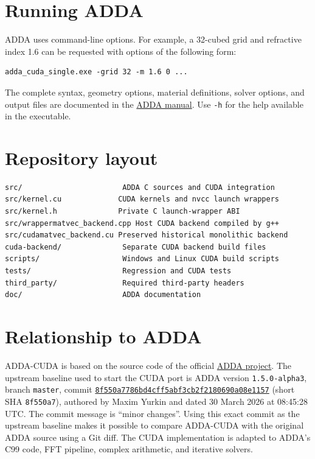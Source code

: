 \documentclass[11pt,a4paper]{article}
\newcommand{\code}[1]{\nolinkurl{#1}}
\begin{document}
\section{Running ADDA}

ADDA uses command-line options. For example, a 32-cubed grid and refractive
index 1.6 can be requested with options of the following form:

\begin{lstlisting}
adda_cuda_single.exe -grid 32 -m 1.6 0 ...
\end{lstlisting}

The complete syntax, geometry options, material definitions, solver options,
and output files are documented in the \href{https://github.com/adda-team/adda/blob/master/doc/manual.pdf}{ADDA manual}. Use
\code{-h} for the help available in the executable.

\section{Repository layout}

\begin{lstlisting}
src/                       ADDA C sources and CUDA integration
src/kernel.cu             CUDA kernels and nvcc launch wrappers
src/kernel.h              Private C launch-wrapper ABI
src/wrappermatvec_backend.cpp Host CUDA backend compiled by g++
src/cudamatvec_backend.cu Preserved historical monolithic backend
cuda-backend/              Separate CUDA backend build files
scripts/                   Windows and Linux CUDA build scripts
tests/                     Regression and CUDA tests
third_party/               Required third-party headers
doc/                       ADDA documentation
\end{lstlisting}

\section{Relationship to ADDA}

ADDA-CUDA is based on the source code of the official
\href{https://github.com/adda-team/adda}{ADDA project}. The upstream baseline
used to start the CUDA port is ADDA version \code{1.5.0-alpha3}, branch
\code{master}, commit
\href{https://github.com/adda-team/adda/commit/8f550a7786bd4cff5abf3cb2f2180690a08e1157}{\code{8f550a7786bd4cff5abf3cb2f2180690a08e1157}}
(short SHA \code{8f550a7}), authored by Maxim Yurkin and dated 30 March 2026
at 08:45:28 UTC. The commit message is ``minor changes''. Using this exact commit as the upstream baseline
makes it possible to compare ADDA-CUDA with the original ADDA source using a
Git diff. The CUDA implementation is adapted to ADDA's C99 code, FFT pipeline,
complex arithmetic, and iterative solvers.
\end{document}

